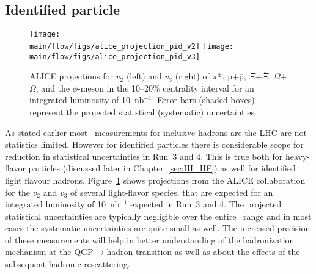\subsection{Identified particle \vn}\label{sec:identified_particle_vn}


\begin{figure}[!htb]
\begin{center}
\texttt{[image: \\main/flow/figs/alice\_projection\_pid\_v2]}
\texttt{[image: \\main/flow/figs/alice\_projection\_pid\_v3]}
\caption{
ALICE projections for $v_2$ (left) and $v_3$ (right) of $\pi^\pm$, 
  $\mathrm{p}$+$\overline{\mathrm{p}}$, $\Xi$+$\overline{\Xi}$, 
  $\Omega$+$\overline{\Omega}$, and the $\phi$-meson 
  in the 10--20\% centrality interval
  for an integrated luminosity of 10~nb$^{-1}$. 
Error bars (shaded boxes) represent the projected statistical 
  (systematic) uncertainties.}
\label{fig:alice_vn}
\end{center}
\end{figure}

As stated earlier most \vn\ measurements for inclusive hadrons are the LHC 
  are not statistics limited.
However for identified particles there is considerable scope for reduction 
  in statistical uncertainties in Run~3 and 4.
This is true both for heavy-flavor particles (discussed later in Chapter~\ref{sec:HI_HF})
  as well for identified light flavour hadrons.
Figure~\ref{fig:alice_vn} shows projections from the ALICE collaboration for 
  the $v_2$ and $v_3$ of several light-flavor species, that are expected for 
  an integrated luminosity of 10~nb$^{-1}$ expected in Run~3 and 4. 
The projected statistical uncertainties are typically negligible over the 
  entire \pt\ range and in most cases the systematic uncertainties are 
  quite small as well.
The increased precision of these measurements will help in better understanding 
  of the hadronization mechanism at the QGP$\rightarrow$hadron transition
  as well as about the effects of the subsequent hadronic rescattering.



